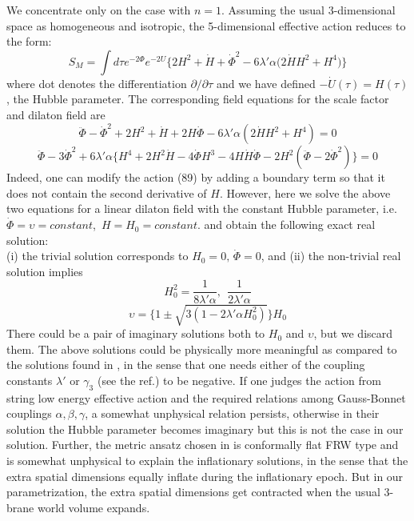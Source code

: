 \documentclass[a4paper,12pt]{article}
\begin{document}
We concentrate only on the case with $n=1$. Assuming the usual 3-dimensional 
space as homogeneous and isotropic, the 5-dimensional effective action 
reduces to the form:
\begin{equation}
S_M=\int d\tau e^{-2\Phi} e^{-2U}\Big\{2H^2+\dot{H}+\dot{\Phi}^2
-6\lambda'\alpha\big(2\dot{H}H^2+H^4\big)\Big\}
\end{equation}
where dot denotes the differentiation $\partial/{\partial \tau}$ and we 
have defined $-\dot{U}(\tau)= H(\tau)$, the Hubble parameter. The 
corresponding field equations for the scale factor and dilaton field are
\begin{equation}
\ddot{\Phi}-\dot{\Phi}^2+ 2H^2+\dot{H}+2H\dot{\Phi}
-6\lambda' \alpha (2\dot{H}H^2+H^4)=0
\end{equation}
\begin{equation}
\ddot{\Phi}-3\dot{\Phi}^2+6\lambda'\alpha\big\{H^4+2H^2\dot{H}
-4\dot{\Phi}H^3-4H\dot{H}\dot{\Phi}-2H^2(\ddot{\Phi}-2\dot{\Phi}^2)\big\}=0
\end{equation}
Indeed, one can modify the action (89) by adding a boundary term so that
it does not contain the second derivative of $H$. However, here we solve 
the above two equations for a linear dilaton field with the constant
Hubble parameter, i.e. $\dot{\Phi}=\upsilon= constant$, \,$H=H_0= constant$. 
and obtain the following exact real solution:\\
(i) the trivial solution corresponds to $H_0=0,\,\dot{\Phi}=0$, and 
(ii) the non-trivial real solution implies 
\begin{equation}
H_0^2=\frac{1}{8\lambda'\alpha}, ~~ \frac{1}{2\lambda'\alpha}
\end{equation}
\begin{equation}
\upsilon=\big\{1\pm\sqrt{3(1-2\lambda'\alpha H_0^2)}\big\}H_0
\end{equation}
There could be a pair of imaginary solutions both to $H_0$ and $\upsilon$, 
but we discard them. The above solutions could be physically more 
meaningful as compared to the solutions found in \cite{ILS}, in the sense 
that one needs either of the coupling constants $\lambda'$ or $\gamma_3$ 
(see the ref.\cite{ILS}) to be negative. If one judges the action from 
string low energy effective action and the required relations among 
Gauss-Bonnet couplings $\alpha, \beta, \gamma$, a somewhat unphysical 
relation persists, otherwise in their solution the Hubble 
parameter becomes imaginary but this is not the case in our solution. 
Further, the metric ansatz chosen in \cite{ILS} is conformally flat FRW 
type and is somewhat unphysical to explain the inflationary solutions, in the 
sense that the extra spatial dimensions equally inflate during the 
inflationary epoch. But in our parametrization, the extra spatial dimensions 
get contracted when the usual 3-brane world volume expands.   
\end{document}
